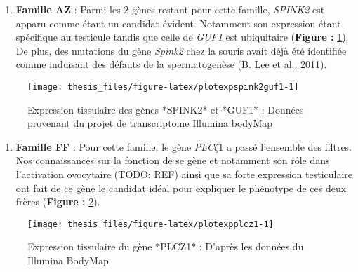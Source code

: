 \documentclass[12pt,twoside]{reedthesis}
\providecommand{\tightlist}{%
  \setlength{\itemsep}{0pt}\setlength{\parskip}{0pt}}
\theoremstyle{definition}
\theoremstyle{definition}
\theoremstyle{remark}
\begin{document}
  \begin{enumerate}
  \def\labelenumi{\arabic{enumi}.}
  \tightlist
  \item
    \textbf{Famille AZ} : Parmi les 2 gènes restant pour cette famille,
    \emph{SPINK2} est apparu comme étant un candidat évident. Notamment
    son expression étant spécifique au testicule tandis que celle de
    \emph{GUF1} est ubiquitaire (\textbf{Figure :
    }\ref{fig:plotexpspink2guf1}). De plus, des mutations du gène
    \emph{Spink2} chez la souris avait déjà été identifiée comme induisant
    des défauts de la spermatogenèse (B. Lee et al.,
    \protect\hyperlink{ref-Lee2011}{2011}).
  \end{enumerate}
  
  \begin{figure}
  
  {\centering \texttt{[image: thesis\_files/figure-latex/plotexpspink2guf1-1]} 
  
  }
  
  \caption[Expression tissulaire des gènes *SPINK2* et *GUF1*]{Expression tissulaire des gènes *SPINK2* et *GUF1* : Données provenant du projet de transcriptome Illumina bodyMap}\label{fig:plotexpspink2guf1}
  \end{figure}
  
  \begin{enumerate}
  \def\labelenumi{\arabic{enumi}.}
  \setcounter{enumi}{1}
  \tightlist
  \item
    \textbf{Famille FF} : Pour cette famille, le gène
    \emph{PLC}\(\zeta 1\) a passé l'ensemble des filtres. Nos
    connaissances sur la fonction de se gène et notamment son rôle dans
    l'activation ovocytaire (TODO: REF) ainsi que sa forte expression
    testiculaire ont fait de ce gène le candidat idéal pour expliquer le
    phénotype de ces deux frères (\textbf{Figure :
    }\ref{fig:plotexpplcz1}).
  \end{enumerate}
  
  \begin{figure}
  
  {\centering \texttt{[image: thesis\_files/figure-latex/plotexpplcz1-1]} 
  
  }
  
  \caption[Expression tissulaire du gène *PLCZ1*]{Expression tissulaire du gène *PLCZ1* : D'après les données du Illumina BodyMap}\label{fig:plotexpplcz1}
  \end{figure}
  
\end{document}
